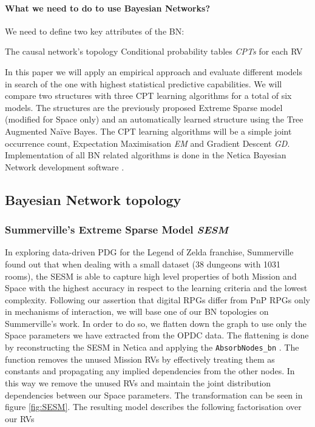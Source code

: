 \documentclass{UoYCSproject}
\begin{document}
\paragraph{What we need to do to use Bayesian Networks?}
We need to define two key attributes of the BN:
\begin{outline}[enumerate]
  \1 The causal network's topology
  \1 Conditional probability tables \textit{CPTs} for each RV
\end{outline}
In this paper we will apply an empirical approach and evaluate different models in search of the one with highest statistical predictive capabilities. We will compare two structures with three CPT learning algorithms for a total of six models. The structures are the previously proposed Extreme Sparse model \parencite{SummervilleSamplingHyrule} (modified for Space only) and an automatically learned structure using the Tree Augmented Na\"{i}ve Bayes. The CPT learning algorithms will be a simple joint occurrence count, Expectation Maximisation \textit{EM} and Gradient Descent \textit{GD}. Implementation of all BN related algorithms is done in the Netica Bayesian Network development software \parencite{netica}.

\subsection{Bayesian Network topology}
\subsubsection{Summerville's Extreme Sparse Model \textit{SESM}}
In exploring data-driven PDG for the Legend of Zelda franchise, Summerville found out that when dealing with a small dataset (38 dungeons with 1031 rooms), the SESM is able to capture high level properties of both Mission and Space with the highest accuracy in respect to the learning criteria and the lowest complexity. Following our assertion that digital RPGs differ from PnP RPGs only in mechanisms of interaction, we will base one of our BN topologies on Summerville's work. In order to do so, we flatten down the graph to use only the Space parameters we have extracted from the OPDC data. The flattening is done by reconstructing the SESM in Netica and applying the \texttt{AbsorbNodes\_bn} \parencite[62-63]{neticaCman}. The function removes the unused Mission RVs by effectively treating them as constants and propagating any implied dependencies from the other nodes. In this way we remove the unused RVs and maintain the joint distribution dependencies between our Space parameters. The transformation can be seen in figure \ref{fig:SESM}. The resulting model describes the following factorisation over our RVs
\end{document}
